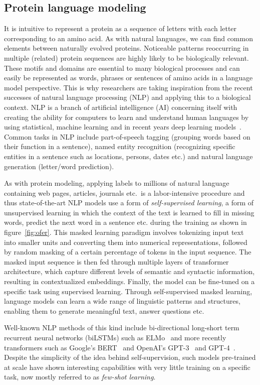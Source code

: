 \subsection{Protein language modeling}\label{ssec:nlp}
It is intuitive to represent a protein as a sequence of letters with each letter corresponding to an amino acid. As with natural languages, we can find common elements between naturally evolved proteins. Noticeable patterns reoccurring in multiple (related) protein sequences are highly likely to be biologically relevant. These motifs and domains are essential to many biological processes and can easily be represented as words, phrases or sentences of amino acids in a language model perspective. This is why researchers are taking inspiration from the recent successes of natural language processing (NLP) and applying this to a biological context. NLP is a branch of artificial intelligence (AI) concerning itself with creating the ability for computers to learn and understand human languages by using statistical, machine learning and in recent years deep learning models~\cite{Ofer}. Common tasks in NLP include part-of-speech tagging (grouping words based on their function in a sentence), named entity recognition (recognizing specific entities in a sentence such as locations, persons, dates etc.) and natural language generation (letter/word prediction).

As with protein modeling, applying labels to millions of natural language containing web pages, articles, journals etc.\ is a labor-intensive procedure and thus state-of-the-art NLP models use a form of \textit{self-supervised learning}, a form of unsupervised learning in which the context of the text is learned to fill in missing words, predict the next word in a sentence etc. during the training as shown in figure~\ref{fig:ofer}. This masked learning paradigm involves tokenizing input text into smaller units and converting them into numerical representations, followed by random masking of a certain percentage of tokens in the input sequence. The masked input sequence is then fed through multiple layers of transformer architecture, which capture different levels of semantic and syntactic information, resulting in contextualized embeddings. Finally, the model can be fine-tuned on a specific task using supervised learning. Through self-supervised masked learning, language models can learn a wide range of linguistic patterns and structures, enabling them to generate meaningful text, answer questions etc.

Well-known NLP methods of this kind include bi-directional long-short term recurrent neural networks (biLSTMs) such as ELMo~\cite{elmo} and more recently transformers such as Google's BERT~\cite{bert} and OpenAI's GPT-3~\cite{gpt3} and GPT-4~\cite{gpt4}. Despite the simplicity of the idea behind self-supervision, such models pre-trained at scale have shown interesting capabilities with very little training on a specific task, now mostly referred to as \textit{few-shot learning}.

